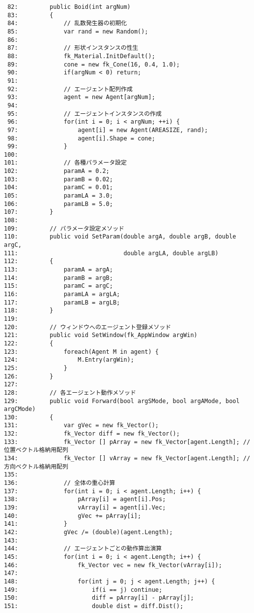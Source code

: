 \begin{breakbox}
\begin{small}
\begin{verbatim}
 82:         public Boid(int argNum)
 83:         {
 84:             // 乱数発生器の初期化
 85:             var rand = new Random();
 86: 
 87:             // 形状インスタンスの性生
 88:             fk_Material.InitDefault();
 89:             cone = new fk_Cone(16, 0.4, 1.0);
 90:             if(argNum < 0) return;
 91: 
 92:             // エージェント配列作成
 93:             agent = new Agent[argNum];
 94: 
 95:             // エージェントインスタンスの作成
 96:             for(int i = 0; i < argNum; ++i) {
 97:                 agent[i] = new Agent(AREASIZE, rand);
 98:                 agent[i].Shape = cone;
 99:             }
100: 
101:             // 各種パラメータ設定
102:             paramA = 0.2;
103:             paramB = 0.02;
104:             paramC = 0.01;
105:             paramLA = 3.0;
106:             paramLB = 5.0;
107:         }
108: 
109:         // パラメータ設定メソッド
110:         public void SetParam(double argA, double argB, double argC,
111:                              double argLA, double argLB)
112:         {
113:             paramA = argA;
114:             paramB = argB;
115:             paramC = argC;
116:             paramLA = argLA;
117:             paramLB = argLB;
118:         }
119: 
120:         // ウィンドウへのエージェント登録メソッド
121:         public void SetWindow(fk_AppWindow argWin)
122:         {
123:             foreach(Agent M in agent) {
124:                 M.Entry(argWin);
125:             }
126:         }
127: 
128:         // 各エージェント動作メソッド
129:         public void Forward(bool argSMode, bool argAMode, bool argCMode)
130:         {
131:             var gVec = new fk_Vector();
132:             fk_Vector diff = new fk_Vector();
133:             fk_Vector [] pArray = new fk_Vector[agent.Length]; // 位置ベクトル格納用配列
134:             fk_Vector [] vArray = new fk_Vector[agent.Length]; // 方向ベクトル格納用配列
135: 
136:             // 全体の重心計算
137:             for(int i = 0; i < agent.Length; i++) {
138:                 pArray[i] = agent[i].Pos;
139:                 vArray[i] = agent[i].Vec;
140:                 gVec += pArray[i];
141:             }
142:             gVec /= (double)(agent.Length);
143: 
144:             // エージェントごとの動作算出演算
145:             for(int i = 0; i < agent.Length; i++) {
146:                 fk_Vector vec = new fk_Vector(vArray[i]);
147: 
148:                 for(int j = 0; j < agent.Length; j++) {
149:                     if(i == j) continue;
150:                     diff = pArray[i] - pArray[j];
151:                     double dist = diff.Dist();

\end{verbatim}
\end{small}
\end{breakbox}
